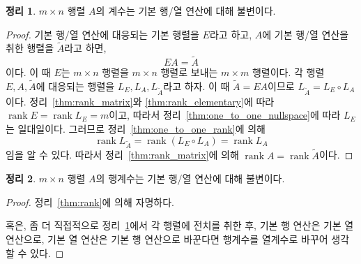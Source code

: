 \documentclass[unfonts,oneside,a4paper]{oblivoir}
\theoremstyle{definition}
\theoremstyle{theorem}
\newtheorem{theorem}{정리}
\theoremstyle{remark}
\theoremstyle{remark}
\theoremstyle{remark}
\theoremstyle{remark}
\DeclareMathOperator{\rank}{rank}
\begin{document}
\begin{theorem} \label{thm:elementary_op_rank}
    $m \times n$ 행렬 $A$의 계수는 기본 행/열 연산에 대해 불변이다.
\end{theorem}

\begin{proof}
    기본 행/열 연산에 대응되는 기본 행렬을 $E$라고 하고, $A$에 기본 행/열 연산을 취한 행렬을 $\tilde A$라고 하면,
    \begin{equation*}
        EA = \tilde A
    \end{equation*}
    이다.
    이 때 $E$는 $m \times n$ 행렬을 $m \times n$ 행렬로 보내는 $m \times m$ 행렬이다.
    각 행렬 $E, A, \tilde A$에 대응되는 행렬을 $L_E, L_A, L_{\tilde A}$라고 하자.
    이 때 $\tilde A = EA$이므로 $L_{\tilde A} = L_E \circ L_A$이다.
    정리~\ref{thm:rank_matrix}와 \ref{thm:rank_elementary}에 따라 $\rank E = \rank L_E = m$이고, 따라서 정리~\ref{thm:one_to_one_nullspace}에 따라 $L_E$는 일대일이다.
    그러므로 정리~\ref{thm:one_to_one_rank}에 의해
    \begin{equation*}
        \rank L_{\tilde A} = \rank (L_E \circ L_A) = \rank L_A
    \end{equation*}
    임을 알 수 있다.
    따라서 정리~\ref{thm:rank_matrix}에 의해 $\rank A = \rank \tilde A$이다.
\end{proof}

\begin{theorem}
    $m \times n$ 행렬 $A$의 행계수는 기본 행/열 연산에 대해 불변이다.
\end{theorem}

\begin{proof}
    정리~\ref{thm:rank}에 의해 자명하다.

    혹은, 좀 더 직접적으로 정리~\ref{thm:elementary_op_rank}에서 각 행렬에 전치를 취한 후, 기본 행 연산은 기본 열 연산으로, 기본 열 연산은 기본 행 연산으로 바꾼다면 행계수를 열계수로 바꾸어 생각할 수 있다.
\end{proof}
\end{document}
